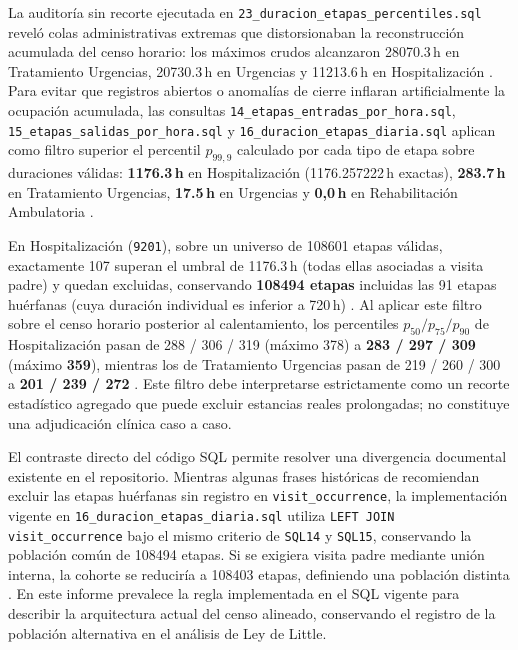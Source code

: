 La auditoría sin recorte ejecutada en \texttt{23\_duracion\_etapas\_percentiles.sql} reveló colas administrativas extremas que distorsionaban la reconstrucción acumulada del censo horario: los máximos crudos alcanzaron \num{28070,3}\,h en Tratamiento Urgencias, \num{20730,3}\,h en Urgencias y \num{11213,6}\,h en Hospitalización \parencite{mediflow2026saturacion,mediflow2026informe}. Para evitar que registros abiertos o anomalías de cierre inflaran artificialmente la ocupación acumulada, las consultas \texttt{14\_etapas\_entradas\_por\_hora.sql}, \texttt{15\_etapas\_salidas\_por\_hora.sql} y \texttt{16\_duracion\_etapas\_diaria.sql} aplican como filtro superior el percentil $p_{99{,}9}$ calculado por cada tipo de etapa sobre duraciones válidas: \textbf{\num{1176,3}\,h} en Hospitalización (\num{1176,257222}\,h exactas), \textbf{\num{283,7}\,h} en Tratamiento Urgencias, \textbf{\num{17,5}\,h} en Urgencias y \textbf{0,0\,h} en Rehabilitación Ambulatoria \parencite{mediflow2026saturacion}.

En Hospitalización (\texttt{9201}), sobre un universo de \num{108601} etapas válidas, exactamente 107 superan el umbral de \num{1176,3}\,h (todas ellas asociadas a visita padre) y quedan excluidas, conservando \textbf{\num{108494} etapas} incluidas las 91 etapas huérfanas (cuya duración individual es inferior a 720\,h) \parencite{mediflow2026informe}. Al aplicar este filtro sobre el censo horario posterior al calentamiento, los percentiles $p_{50}/p_{75}/p_{90}$ de Hospitalización pasan de 288 / 306 / 319 (máximo 378) a \textbf{283 / 297 / 309} (máximo \textbf{359}), mientras los de Tratamiento Urgencias pasan de 219 / 260 / 300 a \textbf{201 / 239 / 272} \parencite{mediflow2026informe}. Este filtro debe interpretarse estrictamente como un recorte estadístico agregado que puede excluir estancias reales prolongadas; no constituye una adjudicación clínica caso a caso.

El contraste directo del código SQL permite resolver una divergencia documental existente en el repositorio. Mientras algunas frases históricas de \textcite{mediflow2026calidad} recomiendan excluir las etapas huérfanas sin registro en \texttt{visit\_occurrence}, la implementación vigente en \texttt{16\_duracion\_etapas\_diaria.sql} utiliza \texttt{LEFT JOIN visit\_occurrence} bajo el mismo criterio de \texttt{SQL14} y \texttt{SQL15}, conservando la población común de \num{108494} etapas. Si se exigiera visita padre mediante unión interna, la cohorte se reduciría a \num{108403} etapas, definiendo una población distinta \parencite{mediflow2026informe}. En este informe prevalece la regla implementada en el SQL vigente para describir la arquitectura actual del censo alineado, conservando el registro de la población alternativa en el análisis de Ley de Little.

